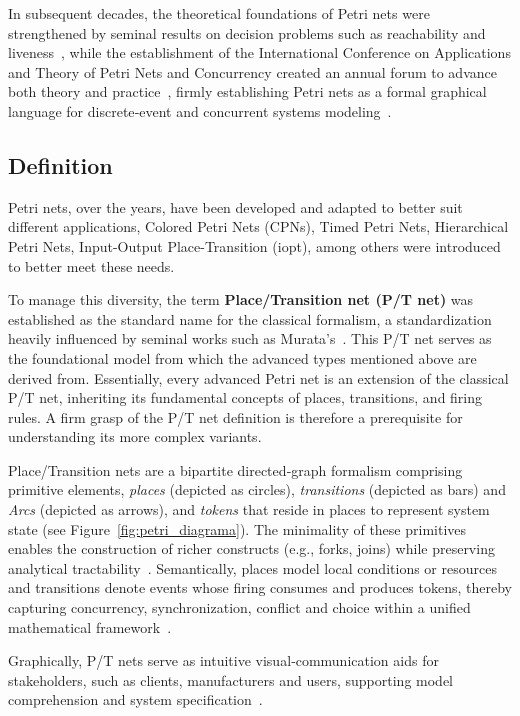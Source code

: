 In subsequent decades, the theoretical foundations of Petri nets were strengthened by seminal results on decision problems such as reachability and liveness~\cite{murata}, while the establishment of the International Conference on Applications and Theory of Petri Nets and Concurrency created an annual forum to advance both theory and practice~\cite{ICPN1980}, firmly establishing Petri nets as a formal graphical language for discrete‐event and concurrent systems modeling~\cite{WikiPetriNet2025}.

\subsection{Definition}
\label{subsec:definition}


Petri nets, over the years, have been developed and adapted to better suit different applications,  Colored Petri Nets (CPNs), Timed Petri Nets, Hierarchical Petri Nets, Input-Output Place-Transition (\gls{iopt}), among others were introduced to better meet these needs. 


To manage this diversity, the term \textbf{Place/Transition net (P/T net)} was established as the standard name for the classical formalism, a standardization heavily influenced by seminal works such as Murata's~\cite{murata}. This P/T net serves as the foundational model from which the advanced types mentioned above are derived from. Essentially, every advanced Petri net is an extension of the classical P/T net, inheriting its fundamental concepts of places, transitions, and firing rules. A firm grasp of the P/T net definition is therefore a prerequisite for understanding its more complex variants.

Place/Transition nets are a bipartite directed‐graph formalism comprising primitive elements, \emph{places} (depicted as circles), \emph{transitions} (depicted as bars) and \emph{Arcs} (depicted as arrows), and \emph{tokens} that reside in places to represent system state (see Figure~\ref{fig:petri_diagrama}). The minimality of these primitives enables the construction of richer constructs (e.g., forks, joins) while preserving analytical tractability~\cite{50-years}. Semantically, places model local conditions or resources and transitions denote events whose firing consumes and produces tokens, thereby capturing concurrency, synchronization, conflict and choice within a unified mathematical framework~\cite{50-years}. 

Graphically, P/T nets serve as intuitive visual‐communication aids for stakeholders, such as clients, manufacturers and users, supporting model comprehension and system specification~\cite{pn-Wolfgang}.

